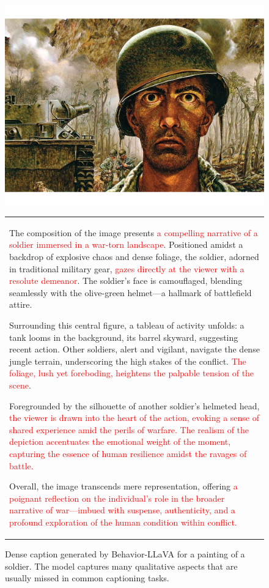 \begin{figure}[t]
\begin{minipage}[c]{0.32\textwidth}
        \centering
        \includegraphics[width=\textwidth]{images/soldier-qualitative_compressed.pdf}
    \end{minipage}
    \hfill
    \begin{minipage}[c]{0.67\textwidth}
\small
\centering
\scriptsize
\begin{tabular}{p{8cm}}
The composition of the image presents \textcolor{red}{a compelling narrative of a soldier immersed in a war-torn landscape}. Positioned amidst a backdrop of explosive chaos and dense foliage, the soldier, adorned in traditional military gear, \textcolor{red}{gazes directly at the viewer with a resolute demeanor}. The soldier's face is camouflaged, blending seamlessly with the olive-green helmet—a hallmark of battlefield attire.

Surrounding this central figure, a tableau of activity unfolds: a tank looms in the background, its barrel skyward, suggesting recent action. Other soldiers, alert and vigilant, navigate the dense jungle terrain, underscoring the high stakes of the conflict. \textcolor{red}{The foliage, lush yet foreboding, heightens the palpable tension of the scene}.

Foregrounded by the silhouette of another soldier's helmeted head, \textcolor{red}{the viewer is drawn into the heart of the action, evoking a sense of shared experience amid the perils of warfare. The realism of the depiction accentuates the emotional weight of the moment, capturing the essence of human resilience amidst the ravages of battle.}

Overall, the image transcends mere representation, offering \textcolor{red}{a poignant reflection on the individual's role in the broader narrative of war—imbued with suspense, authenticity, and a profound exploration of the human condition within conflict.}
\end{tabular}
\end{minipage}
\caption{Dense caption generated by Behavior-LLaVA for a painting of a soldier. The model captures many qualitative aspects that are usually missed in common captioning tasks.}
\label{fig:qualitative-image-3}
\end{figure}
